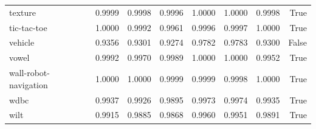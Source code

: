 \begin{table}[htbp]
\begin{tabular}{lrrrrrrr}
texture & 0.9999 & 0.9998 & 0.9996 & 1.0000 & 1.0000 & 0.9998 & True \\
tic-tac-toe & 1.0000 & 0.9992 & 0.9961 & 0.9996 & 0.9997 & 1.0000 & True \\
vehicle & 0.9356 & 0.9301 & 0.9274 & 0.9782 & 0.9783 & 0.9300 & False \\
vowel & 0.9992 & 0.9970 & 0.9989 & 1.0000 & 1.0000 & 0.9952 & True \\
wall-robot-navigation & 1.0000 & 1.0000 & 0.9999 & 0.9999 & 0.9998 & 1.0000 & True \\
wdbc & 0.9937 & 0.9926 & 0.9895 & 0.9973 & 0.9974 & 0.9935 & True \\
wilt & 0.9915 & 0.9885 & 0.9868 & 0.9960 & 0.9951 & 0.9891 & True \\
\hline
\end{tabular}
\end{table}

